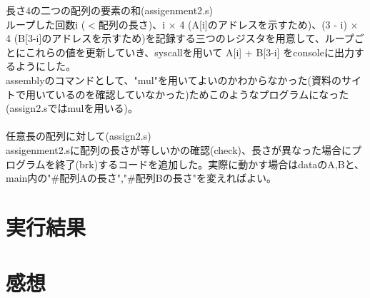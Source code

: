 \documentclass[fleqn]{jarticle}
\begin{document}
    {\large 長さ4の二つの配列の要素の和(assigenment2.s)}\\
    ループした回数i ($<$配列の長さ)、i $\times$ 4 (A[i]のアドレスを示すため)、(3 - i) $\times$ 4 (B[3-i]のアドレスを示すため)を記録する三つのレジスタを用意して、ループごとにこれらの値を更新していき、syscallを用いて A[i] + B[3-i] をconsoleに出力するようにした。\\
    assemblyのコマンドとして、"mul"を用いてよいのかわからなかった(資料のサイトで用いているのを確認していなかった)ためこのようなプログラムになった(assign2.sではmulを用いる)。\\
    \\

    {\large 任意長の配列に対して(assign2.s)}\\
    assigenment2.sに配列の長さが等しいかの確認(check)、長さが異なった場合にプログラムを終了(brk)するコードを追加した。実際に動かす場合はdataのA,Bと、main内の"\#配列Aの長さ","\#配列Bの長さ"を変えればよい。
  \section{実行結果}
  \section{感想}
\end{document}
